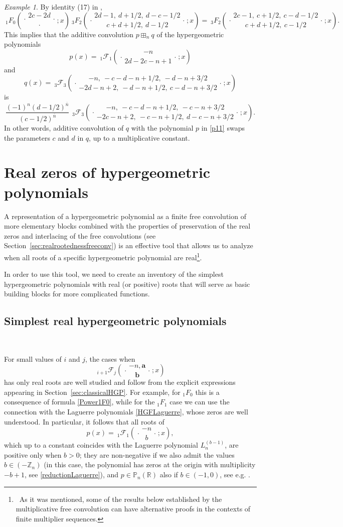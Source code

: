 \documentclass[reqno,11pt]{amsart}
\theoremstyle{remark}
\newtheorem{example}[theorem]{Example}
\renewcommand{\P}{\mathbb{P}}
\newcommand{\R}{\mathbb{R}}
\newcommand{\zz}{\mathbb{Z}}
\newcommand{\raising}[2]{\left(#1\right)^{\overline{#2}}}
\newcommand*\pFq[5]{%
 {\ }_{#1}{\mathcal F}_{#2}{\left(\genfrac..{0pt}{}{#3}{#4};#5\right)}%
}
\newcommand*\HGF[5]{%
 {\ }_{#1} F_{#2}{\left(\genfrac..{0pt}{}{#3}{#4};#5\right)}%
}
\begin{document}
\begin{example} \label{example3.12}
By identity (17) in \cite{grinshpan2013generalized},
$$
\HGF{1}{0}{2c-2d}{\cdot }{x}  \HGF{3}{2}{2d-1,\ d+1/2,\ d-c-1/2}{c+d+1/2,\ d-1/2}{x}=\HGF{3}{2}{2c-1,\ c+1/2,\ c-d-1/2}{c+d+1/2,\ c-1/2}{x}.
$$
This implies that the additive convolution $p\boxplus_n q$ of the hypergeometric polynomials
\begin{equation}
    \label{p11}
    p(x)=\pFq{1}{1}{-n}{2d-2c-n+1}{x}  
\end{equation}
and 
$$
 q(x)=\pFq{3}{3}{-n,\ -c-d-n+1/2,\ -d-n+3/2}{-2d-n+2,\ -d-n+1/2,\ c-d-n+3/2}{x}
$$
is  
$$
\frac{(-1)^n \raising{d-1/2}{n}}{\raising{c-1/2}{n}}\, \pFq{3}{3}{-n,\ -c-d-n+1/2,\ -c-n+3/2}{-2c-n+2,\ -c-n+1/2,\ d-c-n+3/2}{x}.$$
In other words, additive convolution of $q$ with the polynomial $p$ in \eqref{p11} swaps the parameters $c$ and $d$ in $q$, up to a multiplicative constant.
\end{example}


\section{Real zeros of hypergeometric polynomials} \label{sec:compilation}

A representation of a hypergeometric polynomial as a finite free convolution of more elementary blocks combined with the properties of preservation of the real zeros and interlacing of the free convolutions (see Section~\ref{sec:realrootednessfreeconv}) is an effective tool that allows us to analyze when all roots of a specific hypergeometric polynomial are real\footnote{\, As it was mentioned, some of the results below established by the multiplicative free convolution can have alternative proofs in the contexts of ﬁnite multiplier sequences.}.

In order to use this tool, we need to create an inventory of the simplest hypergeometric polynomials with real (or positive) roots that will serve as basic building blocks for more complicated functions. 


\subsection{Simplest real hypergeometric polynomials }\
\label{ssec:simplest.hp}

For small values of $i$ and $j$, the cases when
$$
\pFq{i+1}{j}{-n, \bm a}{\bm b }{x}
$$
has only real roots are well studied and follow from the explicit expressions appearing in Section~\ref{sec:classicalHGP}. For example, for $_1F_0$ this is a consequence of formula \eqref{Power1F0},  while for the $_1F_1$ case we can use the connection with the Laguerre polynomials  \eqref{HGFLaguerre},  whose zeros are well understood. In particular, it follows that all roots of
$$ 
p(x)=\pFq{1}{1}{-n}{b}{x},
$$
which up to a constant coincides with the Laguerre polynomial $L_n^{(b-1)}$, are positive only when $b>0$; they are non-negative if we also admit the values $b\in (-\zz_n)$ (in this case, the polynomial has zeros at the origin with multiplicity $-b+1$, see \eqref{reductionLaguerre}), and $p\in \P_n(\R)$ also if $b\in (-1,0)$, see e.g. \cite[\S 6.73]{szego1975orthogonal}. 
  
\end{document}
